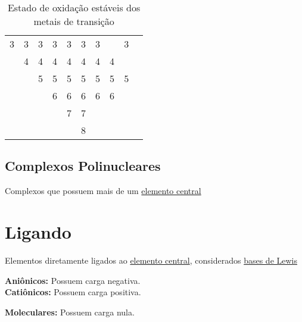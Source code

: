 \documentclass{article}
\begin{document}
{\begin{table}[H]
{\begin{tabular}{*{10}{c}}
	\\
	
	{\color{Emph}3}
	& 3
	& 3	
	& 3		
	& {\color{Emph}3}
	& 3	
	& {\color{Emph}3}		
	& 	 
	& {\color{Emph}3}
	&
	
	\\
	
	
	& {\color{Emph}4}
	& 4	
	& {\color{Emph}4}
	& {\color{Emph}4}
	& {\color{Emph}4}	
	& {\color{Emph}4}	 
	& {\color{Emph}4}
	&
	&
	
	\\
	
	
	& 
	& {\color{Emph}5}
	& {\color{Emph}5}
	& {\color{Emph}5}
	& 5
	& 5		
	& 5 
	& 5
	& 
	
	\\
	
	& 
	& 
	& {\color{Emph}6}	
	& {\color{Emph}6}
	& 6
	& 6	
	& 6	 
	& 
	&
	
	\\
	
	& 
	& 
	& 	
	& {\color{Emph}7}
	& 7
	& 		
	& 	 
	& 
	&
	
	\\
	
	& 
	& 
	& 	
	& 
	& 8
	& 		
	& 	 
	& 
	&
	
	\\ \bottomrule

\end{tabular}
}
\caption{Estado de oxidação estáveis dos metais de transição}
\end{table}
}


\subsection{Complexos Polinucleares}
\label{complexos polinucleares}
Complexos que possuem mais de um \hyperref[elemento central]{elemento central}

\newpage

\section{Ligando}
\label{ligando}
%
Elementos diretamente ligados ao \hyperref[elemento central]{elemento central},
considerados \hyperref[Background - lewis]{bases de Lewis}
%
\begin{multicols}{2}
\textbf{Aniônicos:} Possuem carga negativa.\\
\textbf{Catiônicos:} Possuem carga positiva.
\end{multicols}
\begin{center}
\textbf{Moleculares:} Possuem carga nula.
\end{center}
\end{document}
